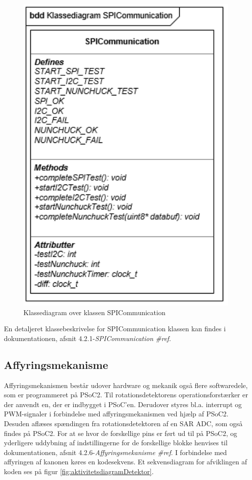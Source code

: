\begin{figure}[H]
	\centering
	\includegraphics[]{DesignOgImplementering/images/SPICommunication}
	\caption{Klassediagram over klassen SPICommunication}
	\label{figure:KlassediagramSPICommunication}
\end{figure}

En detaljeret klassebeskrivelse for SPICommunication klassen kan findes i dokumentationen, afsnit 4.2.1-\textit{SPICommunication \#ref}.

\subsection{Affyringsmekanisme}
 
\noindent Affyringsmekanismen består udover hardware og mekanik også flere softwaredele, som er programmeret på PSoC2. Til rotationsdetektorens operationsforstærker er der anvendt en, der er indbygget i PSoC'en. Derudover styres bl.a. interrupt og PWM-signaler i forbindelse med affyringsmekanismen ved hjælp af PSoC2. Desuden aflæses spændingen fra rotationsdetektoren af en SAR ADC, som også findes på PSoC2. For at se hvor de forskellige pins er ført ud til på PSoC2, og yderligere uddybning af indstillingerne for de forskellige blokke henvises til dokumentationen, afsnit 4.2.6-\textit{Affyringsmekanisme \#ref}. I forbindelse med affyringen af kanonen køres en kodesekvens. Et sekvensdiagram for afviklingen af koden ses på figur \ref{fig:aktivitetsdiagramDetektor}.
 
